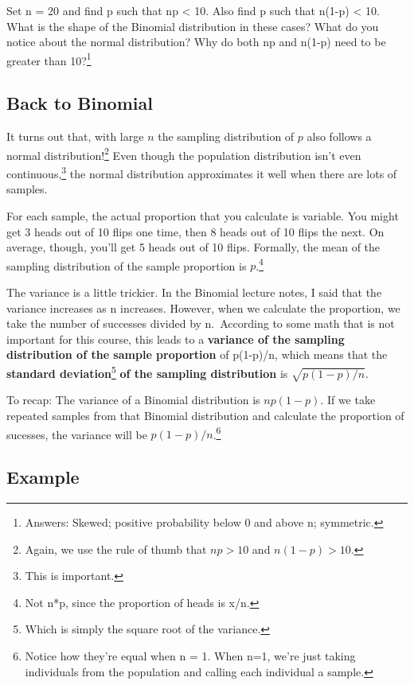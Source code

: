 \documentclass[
  letterpaper,
  DIV=11,
  numbers=noendperiod]{scrreprt}
\begin{document}
Set n = 20 and find p such that np \textless{} 10. Also find p such that
n(1-p) \textless{} 10. What is the shape of the Binomial distribution in
these cases? What do you notice about the normal distribution? Why do
both np and n(1-p) need to be greater than 10?\footnote{Answers: Skewed;
  positive probability below 0 and above n; symmetric.}

\hypertarget{back-to-binomial}{%
\subsection{Back to Binomial}\label{back-to-binomial}}

It turns out that, with large \(n\) the sampling distribution of \(p\)
also follows a normal distribution!\footnote{Again, we use the rule of
  thumb that \(np>10\) and \(n(1-p)>10\).} Even though the population
distribution isn't even continuous,\footnote{This is important.} the
normal distribution approximates it well when there are lots of samples.

For each sample, the actual proportion that you calculate is variable.
You might get 3 heads out of 10 flips one time, then 8 heads out of 10
flips the next. On average, though, you'll get 5 heads out of 10 flips.
Formally, the mean of the sampling distribution of the sample proportion
is \(p\).\footnote{Not n*p, since the proportion of heads is x/n.}

The variance is a little trickier. In the Binomial lecture notes, I said
that the variance increases as n increases. However, when we calculate
the proportion, we take the number of successes divided by n.~According
to some math that is not important for this course, this leads to a
\textbf{variance of the sampling distribution of the sample proportion}
of p(1-p)/n, which means that the \textbf{standard deviation}\footnote{Which
  is simply the square root of the variance.} \textbf{of the sampling
distribution} is \(\sqrt{p(1-p)/n}\).

To recap: The variance of a Binomial distribution is \(np(1-p)\). If we
take repeated samples from that Binomial distribution and calculate the
proportion of sucesses, the variance will be \(p(1-p)/n\).\footnote{Notice
  how they're equal when n = 1. When n=1, we're just taking individuals
  from the population and calling each individual a sample.}

\hypertarget{example-2}{%
\subsection{Example}\label{example-2}}
\end{document}
